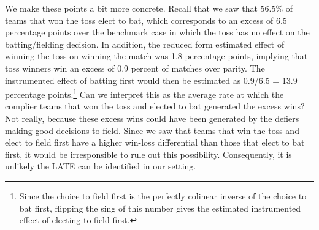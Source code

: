 \documentclass[11pt,  letterpaper]{article}
\begin{document}
We make these points a bit more concrete. Recall that we saw that 56.5\% of teams that won the toss elect to bat, which corresponds to an excess of 6.5 percentage points over the benchmark case in which the toss has no effect on the batting/fielding decision. In addition, the reduced form estimated effect of winning the toss on winning the match was 1.8 percentage points, implying that toss winners win an excess of 0.9 percent of matches over parity. The instrumented effect of batting first would then be estimated as 0.9/6.5 = 13.9 percentage points.\footnote{Since the choice to field first is the perfectly colinear inverse of the choice to bat first, flipping the sing of this number gives the estimated instrumented effect of electing to field first.}  Can we interpret this as the average rate at which the complier teams that won the toss and elected to bat generated the excess wins? Not really, because these excess wins could have been generated by the defiers making good decisions to field. Since we saw that teams that win the toss and elect to field first have a higher win-loss differential than those that elect to bat first, it would be irresponsible to rule out this possibility. Consequently, it is unlikely the LATE can be identified in our setting.



\end{document}
